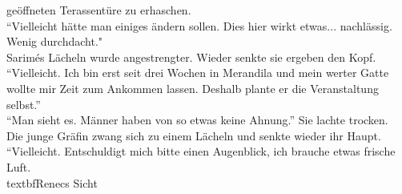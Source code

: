 geöffneten Terassentüre zu erhaschen.\\
``Vielleicht hätte man einiges ändern sollen. Dies hier wirkt etwas... nachlässig. Wenig 
durchdacht."\\
Sarimés Lächeln wurde angestrengter. Wieder senkte sie ergeben den Kopf. ``Vielleicht. Ich bin erst 
seit drei Wochen in Merandila und mein werter Gatte wollte mir Zeit zum Ankommen lassen. Deshalb 
plante er die Veranstaltung selbst.''\\
``Man sieht es. Männer haben von so etwas keine Ahnung.'' Sie lachte trocken.\\
Die junge Gräfin zwang sich zu einem Lächeln und senkte wieder ihr Haupt. ``Vielleicht. 
Entschuldigt mich bitte einen Augenblick, ich brauche etwas frische Luft.\\


textbf{Renecs Sicht} \

